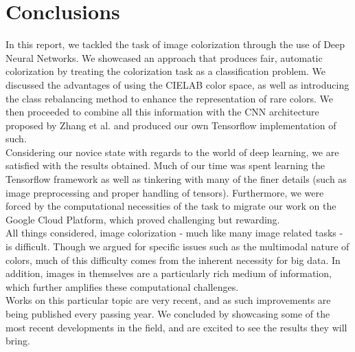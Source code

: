 \documentclass[twoside,twocolumn]{article}
\begin{document}

\newpage

\section{Conclusions}

In this report, we tackled the task of image colorization through the use of Deep Neural Networks. We showcased an approach that produces fair, automatic colorization by treating the colorization task as a classification problem. We discussed the advantages of using the CIELAB color space, as well as introducing the class rebalancing method to enhance the representation of rare colors. We then proceeded to combine all this information with the CNN architecture proposed by Zhang et al. \cite{Zhang:2016} and produced our own Tensorflow implementation of such.\\
Considering our novice state with regards to the world of deep learning, we are satisfied with the results obtained. Much of our time was spent learning the Tensorflow framework as well as tinkering with many of the finer details (such as image preprocessing and proper handling of tensors). Furthermore, we were forced by the computational necessities of the task to migrate our work on the Google Cloud Platform, which proved challenging but rewarding.\\
All things considered, image colorization - much like many image related tasks - is difficult. Though we argued for specific issues such as the multimodal nature of colors, much of this difficulty comes from the inherent necessity for big data. In addition, images in themselves are a particularly rich medium of information, which further amplifies these computational challenges.\\
Works on this particular topic are very recent, and as such improvements are being published every passing year. We concluded by showcasing some of the most recent developments in the field, and are excited to see the results they will bring.

\newpage



\newpage
\end{document}
